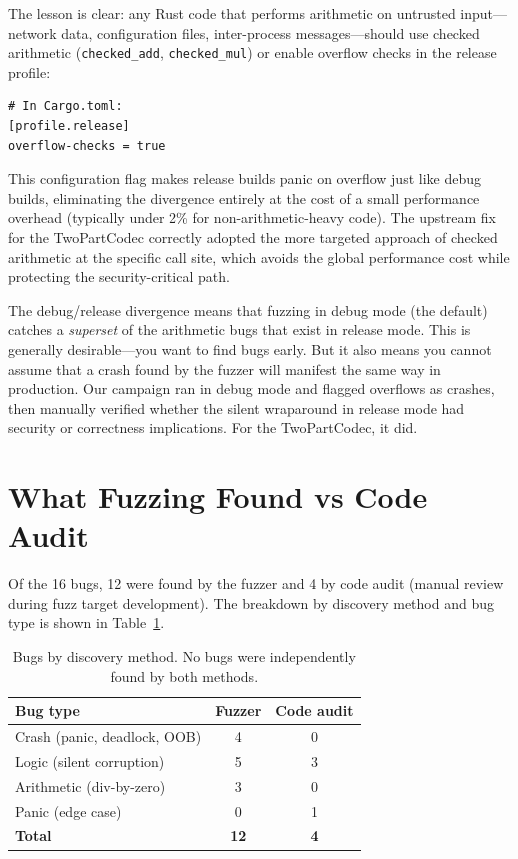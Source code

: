 %
The lesson is clear: any Rust code that performs arithmetic on untrusted input---network data, configuration files, inter-process messages---should use checked arithmetic (\texttt{checked\_add}, \texttt{checked\_mul}) or enable overflow checks in the release profile:

\begin{verbatim}
# In Cargo.toml:
[profile.release]
overflow-checks = true
\end{verbatim}

This configuration flag makes release builds panic on overflow just like debug builds, eliminating the divergence entirely at the cost of a small performance overhead (typically under 2\% for non-arithmetic-heavy code). The upstream fix for the TwoPartCodec correctly adopted the more targeted approach of checked arithmetic at the specific call site, which avoids the global performance cost while protecting the security-critical path.

\begin{notebox}
The debug/release divergence means that fuzzing in debug mode (the default) catches a \emph{superset} of the arithmetic bugs that exist in release mode. This is generally desirable---you want to find bugs early. But it also means you cannot assume that a crash found by the fuzzer will manifest the same way in production. Our campaign ran in debug mode and flagged overflows as crashes, then manually verified whether the silent wraparound in release mode had security or correctness implications. For the TwoPartCodec, it did.
\end{notebox}

\section{What Fuzzing Found vs Code Audit}
\label{sec:findings:comparison}

Of the 16 bugs, 12 were found by the fuzzer and 4 by code audit (manual review during fuzz target development). The breakdown by discovery method and bug type is shown in Table~\ref{tab:discovery-method}.

\begin{table}[ht]
\centering
\begin{tabular}{lcc}
\toprule
\textbf{Bug type} & \textbf{Fuzzer} & \textbf{Code audit} \\
\midrule
Crash (panic, deadlock, OOB)  & 4 & 0 \\
Logic (silent corruption)     & 5 & 3 \\
Arithmetic (div-by-zero)      & 3 & 0 \\
Panic (edge case)             & 0 & 1 \\
\midrule
\textbf{Total} & \textbf{12} & \textbf{4} \\
\bottomrule
\end{tabular}
\caption{Bugs by discovery method. No bugs were independently found by both methods.}
\label{tab:discovery-method}
\end{table}

